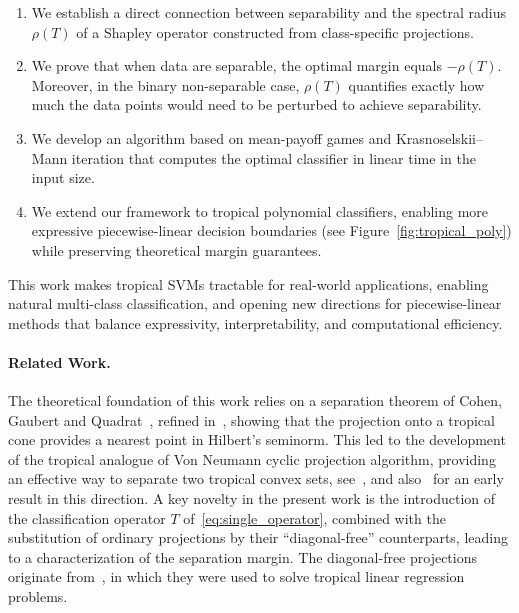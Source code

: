 \documentclass{article}
\begin{document}
\begin{enumerate}
    \item We establish a direct connection between separability and the spectral radius $\rho(T)$ of a Shapley operator constructed from class-specific projections.
    
    \item We prove that when data are separable, the optimal margin equals $-\rho(T)$. Moreover, in the binary non-separable case, $\rho(T)$ quantifies exactly how much the data points would need to be perturbed to achieve separability.
    
    \item We develop an algorithm based on mean-payoff games and Krasnoselskii--Mann iteration that computes the optimal classifier in linear time in the input size.
    
    \item We extend our framework to tropical polynomial classifiers, enabling more expressive piecewise-linear decision boundaries (see Figure~\ref{fig:tropical_poly}) while preserving theoretical margin guarantees.
\end{enumerate}

This work makes tropical SVMs tractable for real-world applications, enabling natural multi-class classification, and opening new directions for piecewise-linear methods that balance expressivity, interpretability, and computational efficiency.

\paragraph{Related Work.}
The theoretical foundation of this work relies on a separation theorem of Cohen, Gaubert and Quadrat~\cite{cohen2004}, refined in~\cite{AGNS10},  showing that the projection onto a tropical cone provides a nearest point in Hilbert's seminorm. This led to the development of the tropical
analogue of Von Neumann cyclic projection algorithm, providing an effective
way to separate two tropical convex sets, see~\cite{gaubert2011}, and also~\cite{CuninghameGreen2003} for an early result
in this direction. A key novelty in the present work is the introduction
of the classification operator $T$ of~\eqref{eq:single_operator}, combined
with the substitution of ordinary projections by their ``diagonal-free'' counterparts,
leading to a characterization of the separation margin. The diagonal-free projections
originate from~\cite{akiangaubertqisaadi},
in which they were used to solve tropical linear regression
problems.
\end{document}
